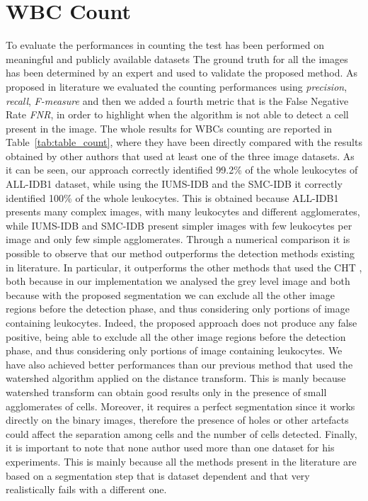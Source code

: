 \documentclass[final,a4paper,12pt,english]{UnicaPhdThesis3}
\begin{document}
	\section{WBC Count} %
	To evaluate the performances in counting the test has been performed on meaningful and publicly available datasets
	The ground truth for all the images has been determined by an expert and used to validate the proposed method. As proposed in literature we evaluated the counting performances using \textit{precision}, \textit{recall}, \textit{F-measure} and then we added a fourth metric that is the False Negative Rate \textit{FNR}, in order to highlight when the algorithm is not able to detect a cell present in the image. The whole results for WBCs counting are reported in Table~\ref{tab:table_count}, where they have been directly compared with the results obtained by other authors that used at least one of the three image datasets. As it can be seen, our approach correctly identified 99.2\% of the whole leukocytes of ALL-IDB1 dataset, while using the IUMS-IDB and the SMC-IDB it correctly identified 100\% of the whole leukocytes. This is obtained because ALL-IDB1 presents many complex images, with many leukocytes and different agglomerates, while IUMS-IDB and SMC-IDB present simpler images with few leukocytes per image and only few simple agglomerates. Through a numerical comparison it is possible to observe that our method outperforms the detection methods existing in literature. In particular, it outperforms the other methods that used the CHT \cite{Mahmood, Alomari}, both because in our implementation we analysed the grey level image and both because with the proposed segmentation we can exclude all the other image regions before the detection phase, and thus considering only portions of image containing leukocytes. Indeed, the proposed approach does not produce any false positive, being able to exclude all the other image regions before the detection phase, and thus considering only portions of image containing leukocytes. We have also achieved better performances than our previous method \cite{Put14b} that used the watershed  algorithm applied on the distance transform. This is manly because watershed transform can obtain good results only in the presence of small agglomerates of cells. Moreover, it requires a perfect segmentation since it works directly on the binary images, therefore the presence of holes or other artefacts could affect the separation among cells and the number of cells detected. Finally, it is important to note that none author used more than one dataset for his experiments. This is mainly because all the methods present in the literature are based on a segmentation step that is dataset dependent and that very realistically fails with a different one.
	
\end{document}
